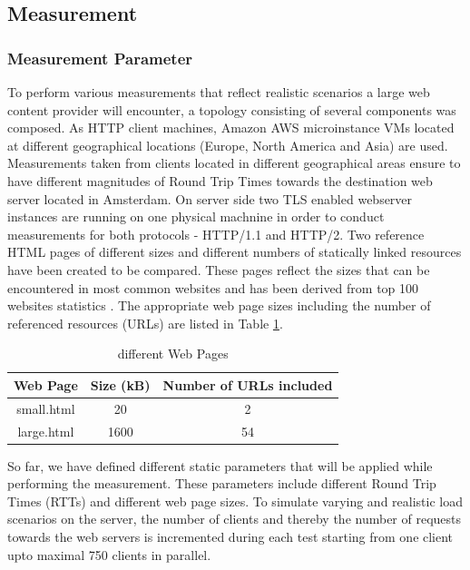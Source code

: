 \subsection{Measurement}
\subsubsection{Measurement Parameter}
\label{subsec:measurements}
To perform various measurements that reflect realistic scenarios a large web content provider will encounter, a topology consisting of several components was composed. As HTTP client machines, Amazon AWS microinstance VMs \cite{amazon} located at different geographical locations (Europe, North America and Asia) are used. Measurements taken from clients located in different geographical areas ensure to have different magnitudes of Round Trip Times towards the destination web server located in Amsterdam. On server side two TLS enabled webserver instances are running on one physical machnine in order to conduct measurements for both protocols - HTTP/1.1 and HTTP/2. Two reference HTML pages of different sizes and different numbers of statically linked resources have been created to be compared. These pages reflect the sizes that can be encountered in most common websites and has been derived from top 100 websites statistics \cite{httparchive}. The appropriate web page sizes including the number of referenced resources (URLs) are listed in Table \ref{table:pages}.

\begin{table}[h]
	\centering
\begin{tabular}{ | c | c | c | }

\hline
\textbf{Web Page} & \textbf{Size (kB)} & \textbf{Number of URLs included}\\ \hline \hline
small.html &  20 & 2 \\ \hline
large.html &  1600 & 54 \\
\hline
\end{tabular}
\caption{different Web Pages}
\label{table:pages}
\end{table}

So far, we have defined different static parameters that will be applied while performing the measurement. These parameters include different Round Trip Times (RTTs) and different web page sizes.  
To simulate varying and realistic load scenarios on the server, the number of clients and thereby the number of requests towards the web servers is incremented during each test starting from one client upto maximal 750 clients in parallel.
\\  
